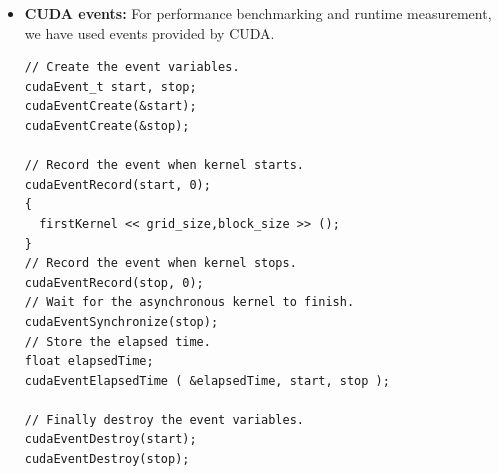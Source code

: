 \begin{itemize}
\begin{lstlisting}[morekeywords={cudaMalloc,cudaMemcpy,cudaMemcpyHostToDevice}]
// Allocate array in host memory
float *h_A = (float *)malloc(size);
// Allocate array in device memory
float *d_A;
cudaMalloc ( &d_A, size );
// Copy array from host memory to device memory
cudaMemcpy ( d_A, h_A, size, cudaMemcpyHostToDevice );
\end{lstlisting}

{\it cudaMemcpy} is used to copy data from host to device memory, or from device to device memory and from device to host memory.

\item {\bf CUDA events:} For performance benchmarking and runtime measurement, we have used events provided by CUDA.

\begin{lstlisting}[morekeywords={cudaEvent_t,cudaEventCreate,cudaEventRecord,cudaEventSynchronize,cudaEventElapsedTime,cudaEventDestroy}]
// Create the event variables.
cudaEvent_t start, stop;
cudaEventCreate(&start);
cudaEventCreate(&stop);

// Record the event when kernel starts.
cudaEventRecord(start, 0);
{
  firstKernel << grid_size,block_size >> ();
}
// Record the event when kernel stops.
cudaEventRecord(stop, 0);
// Wait for the asynchronous kernel to finish.
cudaEventSynchronize(stop);
// Store the elapsed time.
float elapsedTime;
cudaEventElapsedTime ( &elapsedTime, start, stop );

// Finally destroy the event variables.
cudaEventDestroy(start);
cudaEventDestroy(stop);
\end{lstlisting}
\end{itemize}

